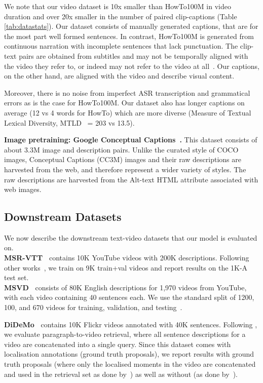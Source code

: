 We note that our video dataset is 10x smaller than HowTo100M in video duration and over 20x smaller in the number of paired clip-captions (Table \ref{tab:datastats}). Our dataset consists of manually generated captions, that are for the most part well formed sentences. In contrast, HowTo100M is generated from continuous narration with incomplete sentences that lack punctuation. The clip-text pairs are obtained from subtitles and may not be temporally aligned with the video they refer to, or indeed may not refer to the video at all~\cite{miech2019howto100m}. Our captions, on the other hand, are aligned with the video and describe visual content.


Moreover, there is no noise from imperfect ASR transcription and grammatical errors as is the case for HowTo100M. Our dataset also has longer captions on average (12 vs 4 words for HowTo) which are more diverse (Measure of Textual Lexical Diversity, MTLD~\cite{mccarthy2010mtld} = 203 vs 13.5).

\noindent\textbf{Image pretraining: Google Conceptual Captions~\cite{sharma2018conceptual}.}
This dataset consists of about 3.3M image and description pairs. Unlike the curated style of COCO images, Conceptual Captions (CC3M) images and their raw descriptions are harvested from the web, and therefore represent a wider variety of styles. The raw descriptions
are harvested from the Alt-text HTML attribute associated with web images.

\subsection{Downstream Datasets}
\label{subsec:datasets2}
We now describe the downstream text-video datasets that our model is evaluated on. \\
\noindent\textbf{MSR-VTT~\cite{xu2016msr}} contains
10K YouTube videos with 200K descriptions. Following other works~\cite{Liu19a}, we train on 9K train+val videos and report results on the 1K-A test set. \\
\noindent\textbf{MSVD~\cite{chen2011collecting}} consists of 80K English descriptions for 1,970 videos from YouTube, with each video containing 40 sentences each. We use the standard split of 1200, 100, and 670 videos for training, validation, and testing~\cite{patrick2020support,Liu19a}.

\noindent\textbf{DiDeMo~\cite{anne2017localizing}} contains 10K Flickr videos annotated with 40K sentences. Following \cite{lei2021less,Liu19a}, we evaluate paragraph-to-video retrieval, where all sentence descriptions for a video are concatenated into a single query. Since this dataset comes with localisation annotations (ground truth proposals), we report results with ground truth proposals (where only the localised moments in the video are concatenated and used in the retrieval set as done by~\cite{lei2021less}) as well as without (as done by~\cite{Liu19a}). 

